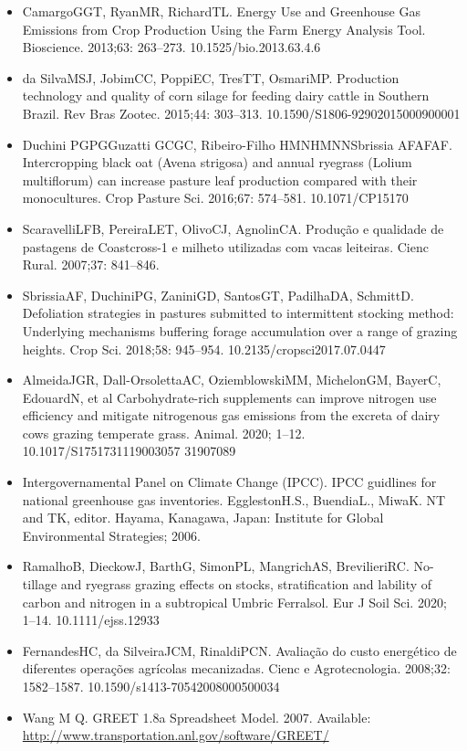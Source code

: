 \documentclass[11pt,a4paper]{article}
\begin{document}
\begin{itemize}
\item CamargoGGT, RyanMR, RichardTL. Energy Use and Greenhouse Gas Emissions from Crop Production Using the Farm Energy Analysis Tool. Bioscience. 2013;63: 263–273. 10.1525/bio.2013.63.4.6
\item da SilvaMSJ, JobimCC, PoppiEC, TresTT, OsmariMP. Production technology and quality of corn silage for feeding dairy cattle in Southern Brazil. Rev Bras Zootec. 2015;44: 303–313. 10.1590/S1806-92902015000900001
\item Duchini PGPGGuzatti GCGC, Ribeiro-Filho HMNHMNNSbrissia AFAFAF. Intercropping black oat (Avena strigosa) and annual ryegrass (Lolium multiflorum) can increase pasture leaf production compared with their monocultures. Crop Pasture Sci. 2016;67: 574–581. 10.1071/CP15170
\item ScaravelliLFB, PereiraLET, OlivoCJ, AgnolinCA. Produção e qualidade de pastagens de Coastcross-1 e milheto utilizadas com vacas leiteiras. Cienc Rural. 2007;37: 841–846.
\item SbrissiaAF, DuchiniPG, ZaniniGD, SantosGT, PadilhaDA, SchmittD. Defoliation strategies in pastures submitted to intermittent stocking method: Underlying mechanisms buffering forage accumulation over a range of grazing heights. Crop Sci. 2018;58: 945–954. 10.2135/cropsci2017.07.0447
\item AlmeidaJGR, Dall-OrsolettaAC, OziemblowskiMM, MichelonGM, BayerC, EdouardN, et al Carbohydrate-rich supplements can improve nitrogen use efficiency and mitigate nitrogenous gas emissions from the excreta of dairy cows grazing temperate grass. Animal. 2020; 1–12. 10.1017/S1751731119003057 31907089
\item Intergovernamental Panel on Climate Change (IPCC). IPCC guidlines for national greenhouse gas inventories. EgglestonH.S., BuendiaL., MiwaK. NT and TK, editor. Hayama, Kanagawa, Japan: Institute for Global Environmental Strategies; 2006.
\item RamalhoB, DieckowJ, BarthG, SimonPL, MangrichAS, BrevilieriRC. No-tillage and ryegrass grazing effects on stocks, stratification and lability of carbon and nitrogen in a subtropical Umbric Ferralsol. Eur J Soil Sci. 2020; 1–14. 10.1111/ejss.12933
\item FernandesHC, da SilveiraJCM, RinaldiPCN. Avaliação do custo energético de diferentes operações agrícolas mecanizadas. Cienc e Agrotecnologia. 2008;32: 1582–1587. 10.1590/s1413-70542008000500034
\item Wang M Q. GREET 1.8a Spreadsheet Model. 2007. Available: \href{http://www.transportation.anl.gov/software/GREET/}{http://www.transportation.anl.gov/software/GREET/}

\end{itemize}
\end{document}

